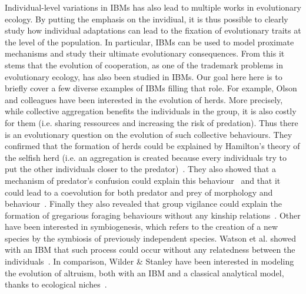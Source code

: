     Individual-level variations in IBMs has also lead to multiple works in evolutionary ecology. By putting the emphasis on the invidiual, it is thus possible to clearly study how individual adaptations can lead to the fixation of evolutionary traits at the level of the population. In particular, IBMs can be used to model proximate mechanisms and study their ultimate evolutionary consequences. From this it stems that the evolution of cooperation, as one of the trademark problems in evolutionary ecology, has also been studied in IBMs. Our goal here here is to briefly cover a few diverse examples of IBMs filling that role. For example, Olson and colleagues have been interested in the evolution of herds. More precisely, while collective aggregation benefits the individuals in the group, it is also costly for them (i.e. sharing ressources and increasing the risk of predation). Thus there is an evolutionary question on the evolution of such collective behaviours. They confirmed that the formation of herds could be explained by Hamilton's theory of the selfish herd (i.e. an aggregation is created because every individuals try to put the other individuals closer to the predator)~\parencite{Hamilton1971, Olson2013a}. They also showed that a mechanism of predator's confusion could explain this behaviour~\parencite{Olson2013} and that it could lead to a coevolution for both predator and prey of morphology and behaviour~\parencite{Olson2016}. Finally they also revealed that group vigilance could explain the formation of gregarious foraging behaviours without any kinship relations~\parencite{Haley2014, Olson2014a}. Other have been interested in symbiogenesis, which refers to the creation of a new species by the symbiosis of previously independent species. Watson et al. showed with an IBM that such process could occur without any relatedness between the individuals~\parencite{Watson1992}. In comparison, Wilder \& Stanley have been interested in modeling the evolution of altruism, both with an IBM and a classical analytical model, thanks to ecological niches~\parencite{Wilder2015}.


